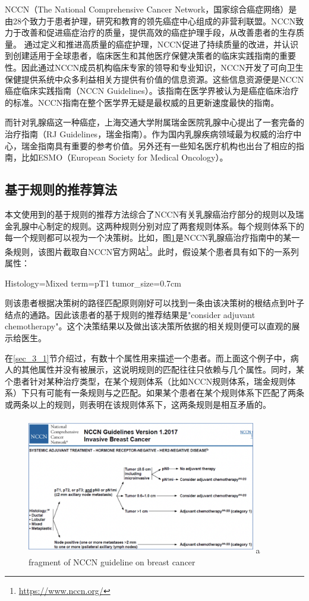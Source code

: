 NCCN（The National Comprehensive Cancer Network，国家综合癌症网络）是由28个致力于患者护理，研究和教育的领先癌症中心组成的非营利联盟。NCCN致力于改善和促进癌症治疗的质量，提供高效的癌症护理手段，从改善患者的生存质量。  通过定义和推进高质量的癌症护理，NCCN促进了持续质量的改进，并认识到创建适用于全球患者，临床医生和其他医疗保健决策者的临床实践指南的重要性。因此通过NCCN成员机构临床专家的领导和专业知识，NCCN开发了可向卫生保健提供系统中众多利益相关方提供有价值的信息资源。这些信息资源便是NCCN癌症临床实践指南（NCCN Guidelines）\cite{Lyman2005Guidelines}。该指南在医学界被认为是癌症临床治疗的标准。NCCN指南在整个医学界无疑是最权威的且更新速度最快的指南。

而针对乳腺癌这一种癌症，上海交通大学附属瑞金医院乳腺中心提出了一套完备的治疗指南（RJ Guidelines，瑞金指南）。作为国内乳腺疾病领域最为权威的治疗中心，瑞金指南具有重要的参考价值。另外还有一些知名医疗机构也出台了相应的指南，比如ESMO（European Society for Medical Oncology）。

\subsection{基于规则的推荐算法}
本文使用到的基于规则的推荐方法综合了NCCN有关乳腺癌治疗部分的规则以及瑞金乳腺中心制定的规则。这两种规则分别对应了两套规则体系。每个规则体系下的每一个规则都可以视为一个决策树。比如，图\ref{fig:ch3-4}是NCCN乳腺癌治疗指南中的某一条规则，该图片截取自NCCN官方网站\footnote{\url{https://www.nccn.org/}}。此时，假设某个患者具有如下的一系列属性：
\begin{center}
Histology=Mixed term=pT1 tumor\_size=0.7cm
\end{center}
则该患者根据决策树的路径匹配原则刚好可以找到一条由该决策树的根结点到叶子结点的通路。因此该患者的基于规则的推荐结果是"consider adjuvant chemotherapy"。这个决策结果以及做出该决策所依据的相关规则便可以直观的展示给医生。

在\ref{sec_3_1}节介绍过，有数十个属性用来描述一个患者。而上面这个例子中，病人的其他属性并没有被展示，这说明规则的匹配往往只依赖与几个属性。同时，某个患者针对某种治疗类型，在某个规则体系（比如NCCN规则体系，瑞金规则体系）下只有可能有一条规则与之匹配。如果某个患者在某个规则体系下匹配了两条或两条以上的规则，则表明在该规则体系下，这两条规则是相互矛盾的。

\begin{figure}[!htp]
  \centering
  \includegraphics[height=6cm,width=10cm]{figure/chap3-8.png}
    {a fragment of NCCN guideline on breast cancer}
  \label{fig:ch3-4}
\end{figure}

